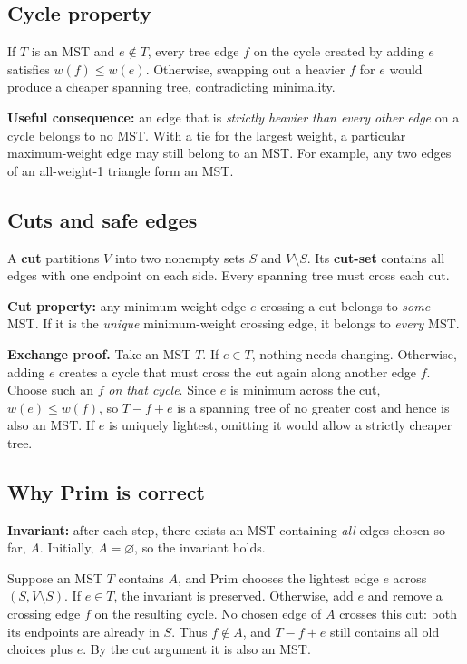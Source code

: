 \documentclass[11pt,letterpaper]{article}
\begin{document}
\subsection{Cycle property}
If $T$ is an MST and $e\notin T$, every tree edge $f$ on the cycle created by adding $e$ satisfies $w(f)\leq w(e)$. Otherwise, swapping out a heavier $f$ for $e$ would produce a cheaper spanning tree, contradicting minimality.

\textbf{Useful consequence:} an edge that is \emph{strictly heavier than every other edge} on a cycle belongs to no MST. With a tie for the largest weight, a particular maximum-weight edge may still belong to an MST. For example, any two edges of an all-weight-1 triangle form an MST.

\subsection{Cuts and safe edges}
A \textbf{cut} partitions $V$ into two nonempty sets $S$ and $V\setminus S$. Its \textbf{cut-set} contains all edges with one endpoint on each side. Every spanning tree must cross each cut.

\textbf{Cut property:} any minimum-weight edge $e$ crossing a cut belongs to \emph{some} MST. If it is the \emph{unique} minimum-weight crossing edge, it belongs to \emph{every} MST.

\textbf{Exchange proof.} Take an MST $T$. If $e\in T$, nothing needs changing. Otherwise, adding $e$ creates a cycle that must cross the cut again along another edge $f$. Choose such an $f$ \emph{on that cycle}. Since $e$ is minimum across the cut, $w(e)\leq w(f)$, so $T-f+e$ is a spanning tree of no greater cost and hence is also an MST. If $e$ is uniquely lightest, omitting it would allow a strictly cheaper tree.

\subsection{Why Prim is correct}
\textbf{Invariant:} after each step, there exists an MST containing \emph{all} edges chosen so far, $A$. Initially, $A=\varnothing$, so the invariant holds.

Suppose an MST $T$ contains $A$, and Prim chooses the lightest edge $e$ across $(S,V\setminus S)$. If $e\in T$, the invariant is preserved. Otherwise, add $e$ and remove a crossing edge $f$ on the resulting cycle. No chosen edge of $A$ crosses this cut: both its endpoints are already in $S$. Thus $f\notin A$, and $T-f+e$ still contains all old choices plus $e$. By the cut argument it is also an MST.
\end{document}
